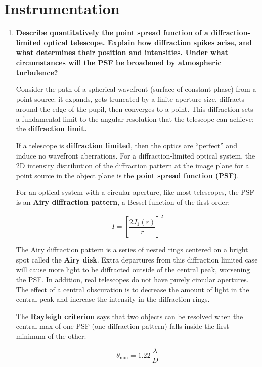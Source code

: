 \documentclass[12pt, letterpaper, preprint]{aastex}
\begin{document}
\section*{Instrumentation}

\begin{enumerate}
\item \textbf{Describe quantitatively the point spread function 
of a diffraction-limited optical telescope. 
Explain how diffraction spikes arise, 
and what determines their position and intensities. 
Under what circumstances will the PSF be broadened by atmospheric
turbulence?}

Consider the path of a spherical wavefront (surface of constant phase) from a point source:
it expands, gets truncated by a finite aperture size,
diffracts around the edge of the pupil, then converges to a point. 
This diffraction sets a fundamental limit to the angular resolution that the telescope can achieve: the \textbf{diffraction limit.}

If a telescope is \textbf{diffraction limited},
then the optics are ``perfect'' and induce no wavefront aberrations.
For a diffraction-limited optical system, the 2D intensity distribution of the diffraction pattern at the image plane for a point source in the object plane is the
\textbf{point spread function (PSF)}.

For an optical system with a circular aperture, like most telescopes, the PSF is an \textbf{Airy diffraction pattern}, a Bessel function of the first order:

\begin{equation}
I = \left[ \frac{2 J_1 (r)}{r} \right]^2
\end{equation}

The Airy diffraction pattern is a series of nested rings centered on a bright spot called the \textbf{Airy disk}. Extra departures from this diffraction limited case will cause more light to be diffracted outside of the central peak, worsening the PSF.
In addition, real telescopes do not have purely circular apertures. The effect of a central obscuration is to decrease the amount of light in the central peak and increase the intensity in the diffraction rings.

The \textbf{Rayleigh criterion} says that two objects can be resolved when the central max of one PSF (one diffraction pattern) falls inside the first minimum of the other: 

\begin{equation}
\theta_\mathrm{min} = 1.22\,\frac{\lambda}{D}
\label{diffraction-limit}
\end{equation}


\end{enumerate}
\end{document}

